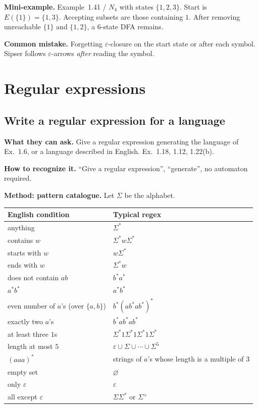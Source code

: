 \documentclass[11pt,a4paper]{article}
\newcommand{\eps}{\varepsilon}
\begin{document}
\textbf{Mini-example.}
Example~1.41 / $N_4$ with states $\{1,2,3\}$. Start is $E(\{1\})=\{1,3\}$.
Accepting subsets are those containing $1$. After removing unreachable
$\{1\}$ and $\{1,2\}$, a $6$-state DFA remains.

\textbf{Common mistake.}
Forgetting $\eps$-closure on the start state or after each symbol.
Sipser follows $\eps$-arrows \emph{after} reading the symbol.

\section{Regular expressions}

\subsection{Write a regular expression for a language}
\label{type:write-re}

\textbf{What they can ask.}
Give a regular expression generating the language of Ex.~1.6, or a
language described in English. Ex.~1.18, 1.12, 1.22(b).

\textbf{How to recognize it.}
``Give a regular expression'', ``generate'', no automaton required.

\textbf{Method: pattern catalogue.}
Let $\Sigma$ be the alphabet.
\begin{center}
\begin{tabular}{@{}ll@{}}
\toprule
English condition & Typical regex \\
\midrule
anything & $\Sigma^*$ \\
contains $w$ & $\Sigma^*w\Sigma^*$ \\
starts with $w$ & $w\Sigma^*$ \\
ends with $w$ & $\Sigma^*w$ \\
does not contain $ab$ & $b^*a^*$ \\
$a^*b^*$ & $a^*b^*$ \\
even number of $a$'s (over $\{a,b\}$) & $b^*(ab^*ab^*)^*$ \\
exactly two $a$'s & $b^*ab^*ab^*$ \\
at least three $1$s & $\Sigma^*1\Sigma^*1\Sigma^*1\Sigma^*$ \\
length at most $5$ & $\eps\cup\Sigma\cup\cdots\cup\Sigma^5$ \\
$(aaa)^*$ & strings of $a$'s whose length is a multiple of $3$ \\
empty set & $\varnothing$ \\
only $\eps$ & $\eps$ \\
all except $\eps$ & $\Sigma\Sigma^*$ or $\Sigma^+$ \\
\bottomrule
\end{tabular}
\end{center}
\end{document}
